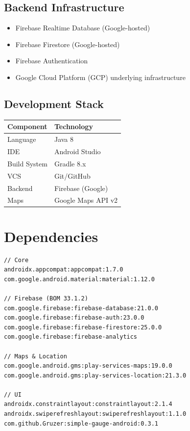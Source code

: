 \documentclass[11pt,a4paper]{report}
\begin{document}
\subsection{Backend Infrastructure}

\begin{itemize}
    \item Firebase Realtime Database (Google-hosted)
    \item Firebase Firestore (Google-hosted)
    \item Firebase Authentication
    \item Google Cloud Platform (GCP) underlying infrastructure
\end{itemize}

\subsection{Development Stack}

\begin{tabular}{|l|l|}
\hline
\textbf{Component} & \textbf{Technology} \\
\hline
Language & Java 8 \\
IDE & Android Studio \\
Build System & Gradle 8.x \\
VCS & Git/GitHub \\
Backend & Firebase (Google) \\
Maps & Google Maps API v2 \\
\hline
\end{tabular}

\section{Dependencies}

\begin{lstlisting}
// Core
androidx.appcompat:appcompat:1.7.0
com.google.android.material:material:1.12.0

// Firebase (BOM 33.1.2)
com.google.firebase:firebase-database:21.0.0
com.google.firebase:firebase-auth:23.0.0
com.google.firebase:firebase-firestore:25.0.0
com.google.firebase:firebase-analytics

// Maps & Location
com.google.android.gms:play-services-maps:19.0.0
com.google.android.gms:play-services-location:21.3.0

// UI
androidx.constraintlayout:constraintlayout:2.1.4
androidx.swiperefreshlayout:swiperefreshlayout:1.1.0
com.github.Gruzer:simple-gauge-android:0.3.1
\end{lstlisting}
\end{document}
